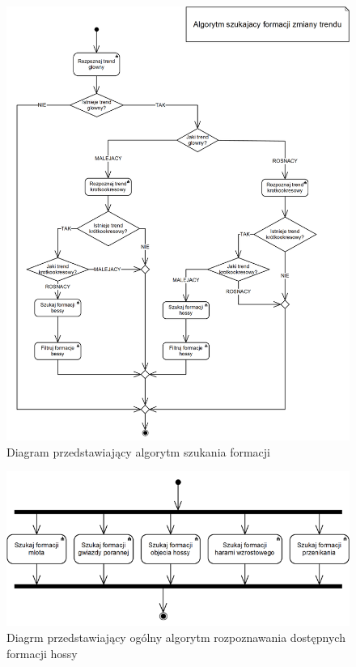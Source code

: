 \documentclass[pdflatex,11pt]{aghdpl}
\begin{document}
\begin{figure}[ht]
\begin{center}
\includegraphics[width=16cm]{warunki_otwarcia.png}
\caption{Diagram przedstawiający algorytm szukania formacji}
\label{warunki_otwarcia}
\end{center}
\end{figure} 

\begin{figure}[ht]
\begin{center}
\includegraphics[width=12cm]{formacje_hossy.png}
\caption{Diagrm przedstawiający ogólny algorytm rozpoznawania dostępnych formacji hossy}
\label{hossy}
\end{center}
\end{figure} 
\end{document}
